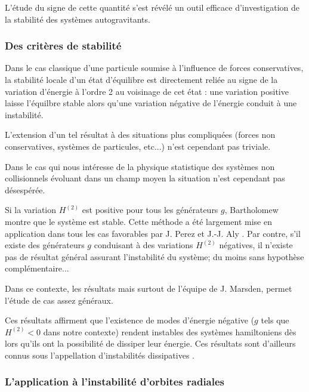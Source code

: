 L'étude du signe de cette quantité s'est révélé un outil efficace d'investigation de la stabilité des systèmes autogravitants.


\subsubsection{Des critères de stabilité}

Dans le cas classique d'une particule soumise à l'influence de forces conservatives, la stabilité locale d'un état d'équilibre est directement reliée au signe de la variation d'énergie à l'ordre 2 au voisinage de cet état : une variation positive laisse l'équilbre stable alors qu'une variation négative de l'énergie conduit à une instabilité.

L'extension d'un tel résultat à des situations plus compliquées (forces non conservatives, systèmes de particules, etc...) n'est cependant pas triviale.

Dans le cas qui nous intéresse de la physique statistique des systèmes non collisionnels évoluant dans un champ moyen la situation n'est cependant pas  désespérée.

Si la variation $H^{(2)}$ est positive pour tous les générateurs $g$,
Bartholomew \cite{bartho} montre que le système est stable. Cette méthode a été largement mise en application dans tous les cas favorables par J. Perez et J.-J. Aly \cite{perezaly}. 
Par contre, s'il existe des générateurs $g$ conduisant à des variations $H^{(2)}$ négatives, il n'existe pas de résultat général assurant l'instabilité du système; du moins sans hypothèse complémentaire...


Dans ce contexte, les résultats  \cite{blochmarsden} mais surtout  \cite{krechet} de l'équipe de J. Marsden, permet l'étude de cas assez généraux.

Ces résultats affirment que l'existence de modes d'énergie négative ($g$ tels que $H^{(2)}<0$ dans notre contexte) rendent instables des systèmes hamiltoniens dès lors qu'ils ont la possibilité de dissiper leur énergie. Ces résultats sont d'ailleurs connus sous l'appellation \og d'instabilités dissipatives \fg.



\subsubsection{L'application à l'instabilité d'orbites radiales}


